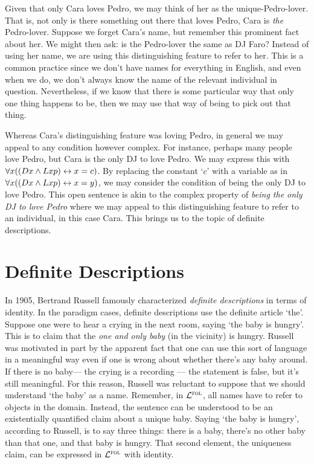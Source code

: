 Given that only Cara loves Pedro, we may think of her as the unique-Pedro-lover.
That is, not only is there something out there that loves Pedro, Cara is \textit{the} Pedro-lover.
Suppose we forget Cara's name, but remember this prominent fact about her.
We might then ask: is the Pedro-lover the same as DJ Faro?
Instead of using her name, we are using this distinguishing feature to refer to her.
This is a common practice since we don't have names for everything in English, and even when we do, we don't always know the name of the relevant individual in question.
Nevertheless, if we know that there is some particular way that only one thing happens to be, then we may use that way of being to pick out that thing.

Whereas Cara's distinguishing feature was loving Pedro, in general we may appeal to any condition however complex.
For instance, perhaps many people love Pedro, but Cara is the only DJ to love Pedro.
We may express this with $\forall x((Dx \wedge Lxp) \leftrightarrow x=c)$.
By replacing the constant `$c$' with a variable as in $\forall x((Dx \wedge Lxp) \leftrightarrow x=y)$, we may consider the condition of being the only DJ to love Pedro.
This open sentence is akin to the complex property of \textit{being the only DJ to love Pedro} where we may appeal to this distinguishing feature to refer to an individual, in this case Cara.
This brings us to the topic of definite descriptions.





\section{Definite Descriptions}
  \label{sec.DefiniteDescription}

In 1905, Bertrand Russell famously characterized \emph{definite descriptions} in terms of identity.
In the paradigm cases, definite descriptions use the definite article `the'.
Suppose one were to hear a crying in the next room, saying `the baby is hungry'.
This is to claim that the \emph{one and only baby} (in the vicinity) is hungry.
Russell was motivated in part by the apparent fact that one can use this sort of language in a meaningful way even if one is wrong about whether there's any baby around.
If there is no baby--- the crying is a recording --- the statement is false, but it's still meaningful.
For this reason, Russell was reluctant to suppose that we should understand `the baby' as a name.
Remember, in $\mathcal{L}^{\textsc{fol}}$, all names have to refer to objects in the domain.
Instead, the sentence can be understood to be an existentially quantified claim about a unique baby.
Saying `the baby is hungry', according to Russell, is to say three things: there is a baby, there's no other baby than that one, and that baby is hungry.
That second element, the uniqueness claim, can be expressed in $\mathcal{L}^{\textsc{fol}}$ with identity. 

